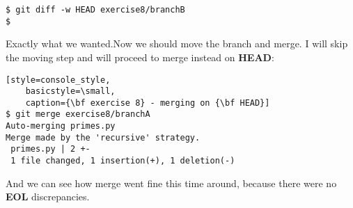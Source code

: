 \begin{lstlisting}[style=console_style,
	basicstyle=\small,
	caption={\bf exercise 8} - comparing results]
$ git diff -w HEAD exercise8/branchB
$
\end{lstlisting}

Exactly what we wanted.Now we should move the branch and merge. I will skip the moving step and will proceed to merge instead on
{\bf HEAD}:

\begin{lstlisting}[style=console_style,
	basicstyle=\small,
	caption={\bf exercise 8} - merging on {\bf HEAD}]
$ git merge exercise8/branchA
Auto-merging primes.py
Merge made by the 'recursive' strategy.
 primes.py | 2 +-
 1 file changed, 1 insertion(+), 1 deletion(-)
\end{lstlisting}

And we can see how merge went fine this time around, because there were no {\bf EOL} discrepancies.
